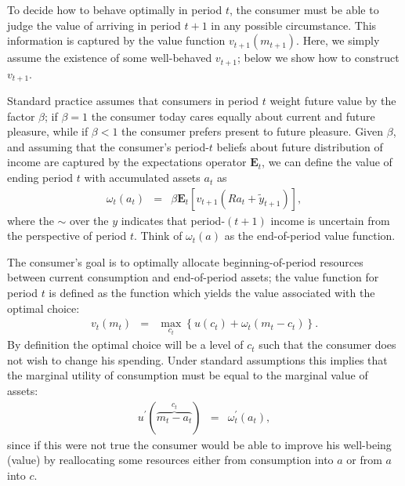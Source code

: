 To decide how to behave optimally in period $t$, the consumer must be able to judge
the value of arriving in period $t+1$ in any possible circumstance.
This information is captured by the value function
${v}_{t+1}({m}_{t+1})$.  Here, we simply assume the existence of some
well-behaved ${v}_{t+1}$; below we show how to construct ${v}_{t+1}.$

Standard practice assumes that consumers in period $t$ weight future
value by the factor $\beta$; if $\beta=1$ the consumer today cares
equally about current and future pleasure, while if $\beta<1$ the
consumer prefers present to future pleasure.  Given $\beta$, and
assuming that the consumer's period-$t$ beliefs about future
distribution of income are captured by the expectations operator
$\mathbf{E}_{t}$, we can define the value of ending period $t$ with accumulated
assets ${a}_{t}$ as
\begin{eqnarray}
  \omega_{t}({a}_{t}) & = & \beta \mathbf{E}_{t}[{v}_{t+1}(R {a}_{t}+\tilde{y}_{t+1})],
\end{eqnarray}
where the $\sim$ over the $y$ indicates that period-$(t+1)$ income
is uncertain from the perspective of period $t$.  Think of $\omega_{t}(a)$ as
the end-of-period value function.

The consumer's goal is to optimally allocate beginning-of-period resources
between current consumption and end-of-period assets; the value function
for period $t$ is defined as the function which yields the value associated
with the optimal choice:
\begin{eqnarray}
  v_{t}(m_{t}) & = & \max_{{c}_{t}} \left\{u({c}_{t}) + \omega_{t}({m}_{t}-{c}_{t})\right\}.
\end{eqnarray}
By definition the optimal choice will be a level of ${c}_{t}$ such that the consumer does not wish to change
his spending. Under standard assumptions this implies that the marginal utility of consumption must be equal to the
marginal value of assets:
\begin{eqnarray}
  u^{\prime}(\overbrace{{m}_{t}-{a}_{t}}^{{c}_{t}}) & = & \omega_{t}^{\prime}({a}_{t}) \label{eq:FOC}
,
\end{eqnarray}
since if this were not true the consumer would be able to improve
his well-being (value) by reallocating some resources either from consumption
into $a$ or from $a$ into $c$.


